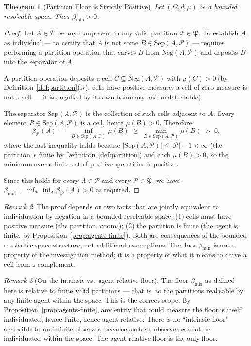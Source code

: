 \documentclass[12pt,a4paper,twocolumn]{article}
\theoremstyle{plain}
\newtheorem{theorem}{Theorem}[section]
\theoremstyle{definition}
\theoremstyle{remark}
\newtheorem{remark}[theorem]{Remark}
\newcommand{\Part}{\mathcal{P}}
\newcommand{\Sep}{\mathrm{Sep}}
\newcommand{\bmin}{\beta_{\min}}
\newcommand{\bP}{\beta_{\mathcal{P}}}
\newcommand{\Neg}{\mathrm{Neg}}
\newcommand{\BRS}{(\Omega,d,\mu)}
\begin{document}
\begin{theorem}[Partition Floor is Strictly Positive]
\label{thm:floor-positive}
Let $\BRS$ be a bounded resolvable space.  Then $\bmin > 0$.
\end{theorem}

\begin{proof}
Let $A \in \Part$ be any component in any valid partition
$\Part \in \mathfrak{P}$.  To establish $A$ as individual --- to certify
that $A$ is not some $B \in \Sep(A, \Part)$ --- requires performing a
partition operation that carves $B$ from $\Neg(A, \Part)$ and deposits $B$
into the separator of $A$.

A partition operation deposits a cell $C \subseteq \Neg(A, \Part)$ with
$\mu(C) > 0$ (by Definition~\ref{def:partition}(iv): cells have positive
measure; a cell of zero measure is not a cell --- it is engulfed by its own
boundary and undetectable).

The separator $\Sep(A, \Part)$ is the collection of such cells adjacent to
$A$.  Every element $B \in \Sep(A, \Part)$ is a cell, hence $\mu(B) > 0$.
Therefore:
\begin{equation}
  \bP(A) \;=\; \inf_{B \in \Sep(A,\Part)} \mu(B) \;\geq\;
    \min_{B \in \Sep(A,\Part)} \mu(B) \;>\; 0,
\end{equation}
where the last inequality holds because $|\Sep(A, \Part)| \leq |\Part| - 1 < \infty$
(the partition is finite by Definition~\ref{def:partition}) and each
$\mu(B) > 0$, so the minimum over a finite set of positive quantities is
positive.

Since this holds for every $A \in \Part$ and every $\Part \in \mathfrak{P}$,
we have $\bmin = \inf_{\Part} \inf_A \bP(A) > 0$ as required.
\end{proof}

\begin{remark}
The proof depends on two facts that are jointly equivalent to individuation
by negation in a bounded resolvable space: (1) cells must have positive
measure (the partition axioms); (2) the partition is finite (the agent is
finite, by Proposition~\ref{prop:agents-finite}).  Both are consequences of
the bounded resolvable space structure, not additional assumptions.  The
floor $\bmin$ is not a property of the investigation method; it is a
property of what it means to carve a cell from a complement.
\end{remark}

\begin{remark}[On the intrinsic vs.\ agent-relative floor]
The floor $\bmin$ as defined here is relative to finite valid partitions ---
that is, to the partitions realisable by any finite agent within the space.
This is the correct scope.  By Proposition~\ref{prop:agents-finite}, any
entity that could measure the floor is itself individuated, hence finite,
hence agent-relative.  There is no ``intrinsic floor'' accessible to an
infinite observer, because such an observer cannot be individuated within
the space.  The agent-relative floor is the only floor.
\end{remark}
\end{document}
